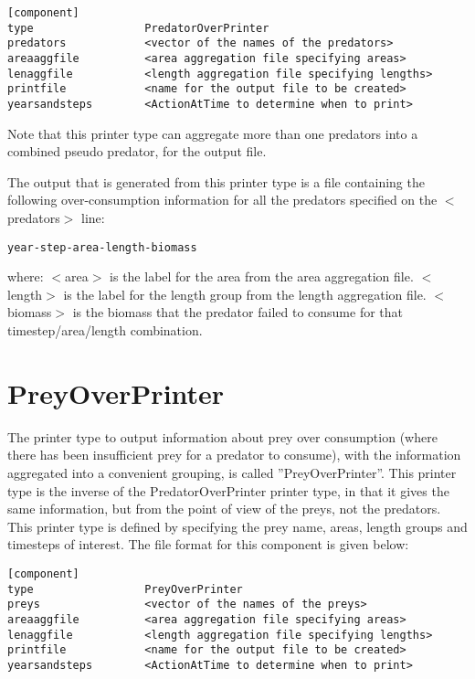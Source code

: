 \documentclass [a4paper, 10pt]{book}
\begin{document}
\begin{verbatim}
[component]
type                 PredatorOverPrinter
predators            <vector of the names of the predators>
areaaggfile          <area aggregation file specifying areas>
lenaggfile           <length aggregation file specifying lengths>
printfile            <name for the output file to be created>
yearsandsteps        <ActionAtTime to determine when to print>
\end{verbatim}

Note that this printer type can aggregate more than one predators into a combined pseudo predator, for the output file.

\bigskip
The output that is generated from this printer type is a file containing the following over-consumption information for all the predators specified on the $<$predators$>$ line:

\begin{verbatim}
year-step-area-length-biomass
\end{verbatim}

where:\newline
$<$area$>$ is the label for the area from the area aggregation file.\newline
$<$length$>$ is the label for the length group from the length aggregation file.\newline
$<$biomass$>$ is the biomass that the predator failed to consume for that timestep/area/length combination.

\section{PreyOverPrinter}\label{sec:preyoverprinter}
The printer type to output information about prey over consumption (where there has been insufficient prey for a predator to consume), with the information aggregated into a convenient grouping, is called ''PreyOverPrinter''.  This printer type is the inverse of the PredatorOverPrinter printer type, in that it gives the same information, but from the point of view of the preys, not the predators.  This printer type is defined by specifying the prey name, areas, length groups and timesteps of interest.  The file format for this component is given below:

\begin{verbatim}
[component]
type                 PreyOverPrinter
preys                <vector of the names of the preys>
areaaggfile          <area aggregation file specifying areas>
lenaggfile           <length aggregation file specifying lengths>
printfile            <name for the output file to be created>
yearsandsteps        <ActionAtTime to determine when to print>
\end{verbatim}
\end{document}
